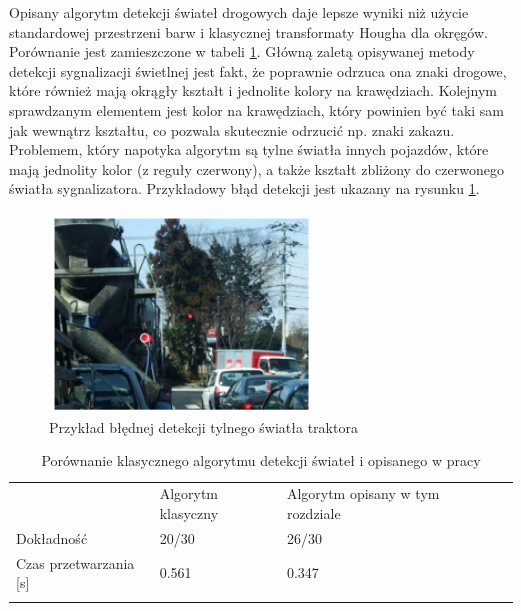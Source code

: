 Opisany algorytm detekcji świateł drogowych daje lepsze wyniki niż użycie standardowej przestrzeni barw i klasycznej transformaty Hougha dla okręgów. 
Porównanie jest zamieszczone w tabeli \ref{tab:tl_results}. 
Główną zaletą opisywanej metody detekcji sygnalizacji świetlnej jest fakt, że poprawnie odrzuca ona znaki drogowe, które również mają okrągły kształt i jednolite kolory na krawędziach. %
Kolejnym sprawdzanym elementem jest kolor na krawędziach, który powinien być taki sam jak wewnątrz kształtu, co pozwala skutecznie odrzucić np. znaki zakazu. %
Problemem, który napotyka algorytm są tylne światła innych pojazdów, które mają jednolity kolor (z reguły czerwony), a także kształt zbliżony do czerwonego światła sygnalizatora. %
Przykładowy błąd detekcji jest ukazany na rysunku \ref{fig:tl_err}.

\begin{figure}
  \centering
  \includegraphics[width=7cm]{img/tl_err.png}
  \caption{Przykład błędnej detekcji tylnego światła traktora\cite{T4}}
  \label{fig:tl_err}
\end{figure}

\begin{table}[]
\centering
\caption{Porównanie klasycznego algorytmu detekcji świateł i opisanego w pracy\cite{T4}} %
\begin{tabular}{lllll}
\cline{1-3}
\multicolumn{1}{|l|}{}                           & \multicolumn{1}{l|}{Algorytm klasyczny} & \multicolumn{1}{l|}{Algorytm opisany w tym rozdziale} &  &  \\ \cline{1-3}
\multicolumn{1}{|l|}{Dokładność}                 & \multicolumn{1}{l|}{20/30}              & \multicolumn{1}{l|}{26/30}                            &  &  \\ \cline{1-3}
\multicolumn{1}{|l|}{Czas przetwarzania {[}s{]}} & \multicolumn{1}{l|}{0.561}              & \multicolumn{1}{l|}{0.347}                            &  &  \\ \cline{1-3}
                                                 &                                         &                                                       &  & 
\end{tabular}
\label{tab:tl_results}
\end{table}

